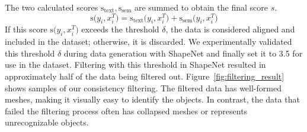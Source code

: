 The two calculated scores $\text{s}_{\text{text}}, \text{s}_{\text{sem}}$ are summed to obtain the final score $s$. 
\begin{equation}
\label{eq:semantic-alignment}
\text{s}\bigl(y_i, x_{i}^{T}\bigr)
=
\text{s}_{\text{text}}\bigl(y_i, x_{i}^{T}\bigr) + \text{s}_{\text{sem}}\bigl(y_i, x_{i}^{T}\bigr)
\end{equation}
If this score $\text{s}\bigl(y_i, x_{i}^{T}\bigr)$ exceeds the threshold $\delta$, the data is considered aligned and included in the dataset; otherwise, it is discarded. 
We experimentally validated this threshold $\delta$ during data generation with ShapeNet and finally set it to 3.5 for use in the dataset. Filtering with this threshold in ShapeNet resulted in approximately half of the data being filtered out.
Figure~\ref{fig:filtering_result} shows samples of our consistency filtering.
The filtered data has well-formed meshes, making it visually easy to identify the objects. In contrast, the data that failed the filtering process often has collapsed meshes or represents unrecognizable objects.

